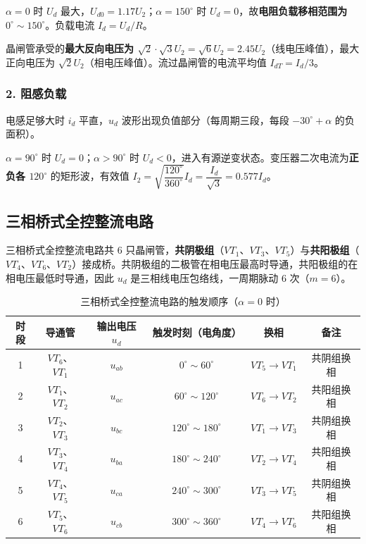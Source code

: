 $\alpha=0$ 时 $U_d$ 最大，$U_{d0}=1.17U_2$；$\alpha=150^\circ$ 时 $U_d=0$，故\textbf{电阻负载移相范围为 $0^\circ\sim150^\circ$}。负载电流 $I_d=U_d/R$。

晶闸管承受的\textbf{最大反向电压为 $\sqrt{2}\cdot\sqrt{3}U_2=\sqrt{6}U_2=2.45U_2$}（线电压峰值），最大正向电压为 $\sqrt{2}U_2$（相电压峰值）。流过晶闸管的电流平均值 $I_{dT}=I_d/3$。

\subsubsection*{2. 阻感负载}

电感足够大时 $i_d$ 平直，$u_d$ 波形出现负值部分（每周期三段，每段 $-30^\circ+\alpha$ 的负面积）。


$\alpha=90^\circ$ 时 $U_d=0$；$\alpha>90^\circ$ 时 $U_d<0$，进入有源逆变状态。变压器二次电流为\textbf{正负各 $120^\circ$} 的矩形波，有效值 $I_2=\sqrt{\dfrac{120^\circ}{360^\circ}}I_d=\dfrac{I_d}{\sqrt{3}}=0.577I_d$。


\subsection{三相桥式全控整流电路}

三相桥式全控整流电路共 6 只晶闸管，\textbf{共阴极组}（$VT_1$、$VT_3$、$VT_5$）与\textbf{共阳极组}（$VT_4$、$VT_6$、$VT_2$）接成桥。共阴极组的二极管在相电压最高时导通，共阳极组的在相电压最低时导通，因此 $u_d$ 是三相线电压包络线，一周期脉动 6 次（$m=6$）。

\begin{table}[htbp]
\centering
\caption{三相桥式全控整流电路的触发顺序（$\alpha=0$ 时）}
\label{tab:3-1}
\begin{tabular}{cccccc}
\toprule
\textbf{时段} & \textbf{导通管} & \textbf{输出电压 $u_d$} & \textbf{触发时刻（电角度）} & \textbf{换相} & \textbf{备注} \\
\midrule
1 & $VT_6$、$VT_1$ & $u_{ab}$ & $0^\circ\sim60^\circ$ & $VT_5\to VT_1$ & 共阴组换相 \\
2 & $VT_1$、$VT_2$ & $u_{ac}$ & $60^\circ\sim120^\circ$ & $VT_6\to VT_2$ & 共阳组换相 \\
3 & $VT_2$、$VT_3$ & $u_{bc}$ & $120^\circ\sim180^\circ$ & $VT_1\to VT_3$ & 共阴组换相 \\
4 & $VT_3$、$VT_4$ & $u_{ba}$ & $180^\circ\sim240^\circ$ & $VT_2\to VT_4$ & 共阳组换相 \\
5 & $VT_4$、$VT_5$ & $u_{ca}$ & $240^\circ\sim300^\circ$ & $VT_3\to VT_5$ & 共阴组换相 \\
6 & $VT_5$、$VT_6$ & $u_{cb}$ & $300^\circ\sim360^\circ$ & $VT_4\to VT_6$ & 共阳组换相 \\
\bottomrule
\end{tabular}
\end{table}

